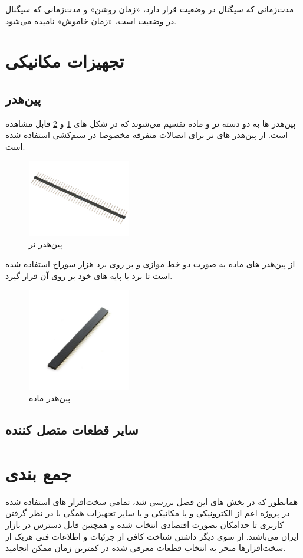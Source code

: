 مدت‌زمانی که سیگنال در وضعیت  قرار دارد، «زمان روشن» و مدت‌زمانی که سیگنال در وضعیت  است، «زمان خاموش»  نامیده می‌شود.

\section{تجهیزات مکانیکی}

\subsection{پین‌هدر}
پین‌هدر ها به دو دسته نر و ماده تقسیم می‌شوند که در شکل های
\ref{پین‌هدر نر}
و
\ref{پین‌هدر ماده}
قابل مشاهده است. از پین‌هدر های نر برای اتصالات متفرقه مخصوصا در سیم‌کشی استفاده شده است.
\begin{figure}[H]
	\centering
	\includegraphics[width=0.4\textwidth]{./images/Chapter4/PinHeaderMale}
	\caption[پین‌هدر نر]{پین‌هدر نر \cite{PinHeaderMale}}
	\label{پین‌هدر نر}
\end{figure}
از پین‌هدر های ماده به صورت دو خط موازی و بر روی برد هزار سوراخ استفاده شده است تا برد
با پایه های خود بر روی آن قرار گیرد.
\begin{figure}[H]
	\centering
	\includegraphics[width=0.4\textwidth]{./images/Chapter4/PinHeaderFemale}
	\caption[پین‌هدر ماده]{پین‌هدر ماده\cite{PinHeaderFemale}}
	\label{پین‌هدر ماده}
\end{figure}

\subsection{سایر قطعات متصل کننده}

\section{جمع بندی}
همانطور که در بخش های این فصل بررسی شد، تمامی سخت‌افزار های استفاده شده در پروژه اعم از الکترونیکی و یا مکانیکی و یا سایر تجهیزات همگی با در نظر گرفتن کاربری تا حدامکان بصورت اقتصادی انتخاب شده و همچنین قابل دسترس در بازار ایران می‌باشند.
از سوی دیگر داشتن شناخت کافی از جزئیات و اطلاعات فنی هریک از سخت‌افزار‌ها منجر به انتخاب  قطعات معرفی شده در کمترین زمان ممکن انجامید.
